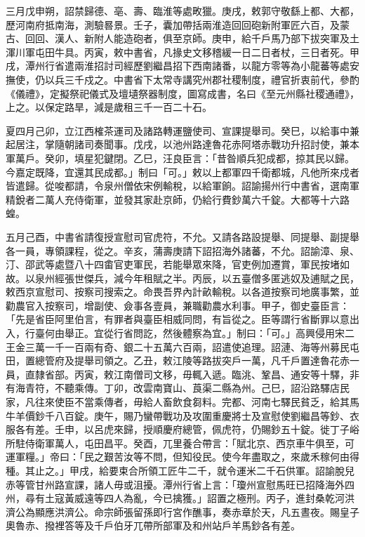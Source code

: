 \begin{pinyinscope}
 三月戊申朔，詔禁歸德、亳、壽、臨淮等處畋獵。庚戌，敕郭守敬繇上都、大都，歷河南府抵南海，測驗晷景。壬子，囊加帶括兩淮造回回砲新附軍匠六百，及蒙古、回回、漢人、新附人能造砲者，俱至京師。庚申，給千戶馬乃部下拔突軍及土渾川軍屯田牛具。丙寅，敕中書省，凡掾史文移稽緩一日二日者杖，三日者死。甲戌，潭州行省遣兩淮招討司經歷劉繼昌招下西南諸番，以龍方零等為小龍蕃等處安撫使，仍以兵三千戍之。中書省下太常寺講究州郡社稷制度，禮官折衷前代，參酌《儀禮》，定擬祭祀儀式及壇壝祭器制度，圖寫成書，名曰《至元州縣社稷通禮》，上之。以保定路旱，減是歲租三千一百二十石。



 夏四月己卯，立江西榷茶運司及諸路轉運鹽使司、宣課提舉司。癸巳，以給事中兼起居注，掌隨朝諸司奏聞事。戊戌，以池州路達魯花赤阿塔赤戰功升招討使，兼本軍萬戶。癸卯，填星犯鍵閉。乙巳，汪良臣言：「昔昝順兵犯成都，掠其民以歸。今嘉定既降，宜還其民成都。」制曰「可。」敕以上都軍四千衛都城，凡他所來戍者皆遣歸。從唆都請，令泉州僧依宋例輸稅，以給軍餉。詔諭揚州行中書省，選南軍精銳者二萬人充侍衛軍，並發其家赴京師，仍給行費鈔萬六千錠。大都等十六路蝗。



 五月己酉，中書省請復授宣慰司官虎符，不允。又請各路設提舉、同提舉、副提舉各一員，專領課程，從之。辛亥，蒲壽庚請下詔招海外諸蕃，不允。詔諭漳、泉、汀、邵武等處暨八十四畬官吏軍民，若能舉眾來降，官吏例加遷賞，軍民按堵如故。以泉州經張世傑兵，減今年租賦之半。丙辰，以五臺僧多匿逃奴及逋賦之民，敕西京宣慰司、按察司搜索之。命畏吾界內計畝輸稅。以各道按察司地廣事繁，並勸農官入按察司，增副使、僉事各壹員，兼職勸農水利事。甲子，御史臺臣言：「先是省臣阿里伯言，有罪者與臺臣相威同問，有旨從之。臣等謂行省斷罪以意出入，行臺何由舉正。宜從行省問訖，然後體察為宜。」制曰：「可。」高興侵用宋二王金三萬一千一百兩有奇、銀二十五萬六百兩，詔遣使追理。詔漣、海等州募民屯田，置總管府及提舉司領之。乙丑，敕江陵等路拔突戶一萬，凡千戶置達魯花赤一員，直隸省部。丙寅，敕江南僧司文移，毋輒入遞。臨洮、鞏昌、通安等十驛，非有海青符，不聽乘傳。丁卯，改雲南寶山、莨渠二縣為州。己巳，詔沿路驛店民家，凡往來使臣不當乘傳者，毋給人畜飲食芻料。完都、河南七驛民貧乏，給其馬牛羊價鈔千八百錠。庚午，賜乃蠻帶戰功及攻圍重慶將士及宣慰使劉繼昌等鈔、衣服各有差。壬申，以呂虎來歸，授順慶府總管，佩虎符，仍賜鈔五十錠。徙丁子峪所駐侍衛軍萬人，屯田昌平。癸酉，兀里養合帶言：「賦北京、西京車牛俱至，可運軍糧。」帝曰：「民之艱苦汝等不問，但知役民。使今年盡取之，來歲禾稼何由得種。其止之。」甲戌，給要束合所領工匠牛二千，就令運米二千石供軍。詔諭脫兒赤等管甘州路宣課，諸人毋或沮擾。潭州行省上言：「瓊州宣慰馬旺已招降海外四州，尋有土寇黃威遠等四人為亂，今已擒獲。」詔置之極刑。丙子，進封桑乾河洪濟公為顯應洪濟公。命宗師張留孫即行宮作醮事，奏赤章於天，凡五晝夜。賜皇子奧魯赤、撥裡答等及千戶伯牙兀帶所部軍及和州站戶羊馬鈔各有差。




\end{pinyinscope}
